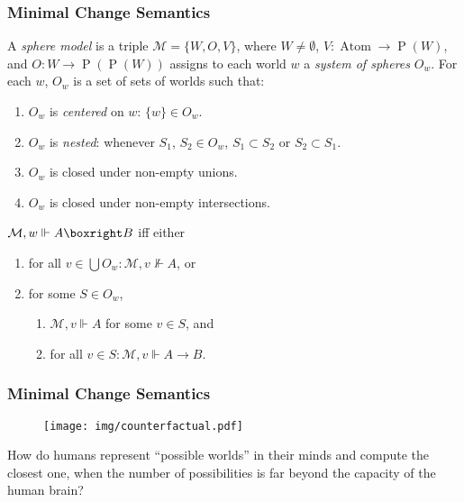 \documentclass[UTF8,11pt,colorlinks,compress,openany]{beamer}%
\begin{document}
\begin{frame}\frametitle{Minimal Change Semantics}
\begin{definition}
A \emph{sphere model} is a triple $\mathcal{M} = \{W,O,V\}$, where $W\ne\emptyset$, $V:\operatorname{Atom} \to \operatorname{P}(W)$, and $O: W \to \operatorname{P}(\operatorname{P}(W))$ assigns to each
 world $w$ a \emph{system of spheres} $O_w$. For each $w$, $O_w$ is a set of sets of worlds such that:
 \begin{enumerate}
 \item $O_w$ is \emph{centered} on $w$: $\{w\} \in O_w$.
 \item $O_w$ is \emph{nested}: whenever $S_1$, $S_2 \in O_w$, $S_1 \subset S_2$ or $S_2 \subset S_1$.
 \item $O_w$ is closed under non-empty unions.
 \item $O_w$ is closed under non-empty intersections.
 \end{enumerate}	
\end{definition}
\begin{definition}
$\mathcal{M},w\Vdash A\boxright B$ iff either
\begin{enumerate}
	\item for all $v\in\bigcup O_w: \mathcal{M},v\nVdash A$, or
	\item for some $S\in O_w$,
	\begin{enumerate}
		\item $\mathcal{M},v\Vdash A$ for some $v\in S$, and
		\item for all $v\in S: \mathcal{M},v\Vdash A\to B$.
	\end{enumerate}
\end{enumerate}
\end{definition}
\end{frame}

\begin{frame}\frametitle{Minimal Change Semantics}
	\begin{figure}[H]
		\texttt{[image: img/counterfactual.pdf]}
	\end{figure}
\begin{problem}
How do humans represent ``possible worlds'' in their minds and compute the closest one, when the number of possibilities is far beyond the capacity of the human brain?
\end{problem}
\end{frame}
\end{document}
